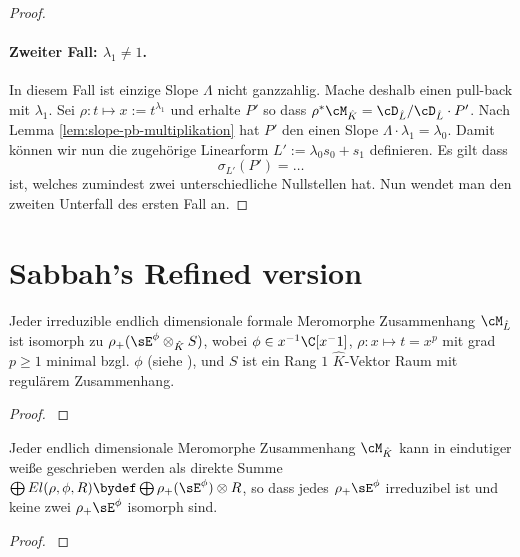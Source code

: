 \begin{proof}
\paragraph{Zweiter Fall: $\lambda_1\neq1$.} In diesem Fall ist einzige Slope
$\Lambda$ nicht ganzzahlig. Mache deshalb einen pull-back mit $\lambda_1$. Sei
$\rho:t\mapsto x:=t^{\lambda_1}$ und erhalte $P'$ so dass $\rho^*\cM_{\hat
K}=\cD_{\hat L}/\cD_{\hat L}\cdot P'$.
Nach Lemma \ref{lem:slope-pb-multiplikation} hat $P'$ den einen Slope
$\Lambda\cdot\lambda_1=\lambda_0$.
Damit können wir nun die zugehörige Linearform $L':=\lambda_0s_0+s_1$
definieren. Es gilt dass
\[
\sigma_{L'}(P')=\dots
\]
ist, welches zumindest zwei unterschiedliche Nullstellen hat. Nun wendet man
den zweiten Unterfall des ersten Fall an.

\end{proof} %

\section{Sabbah's Refined version}
\begin{prop}
\cite[Prop 3.1]{sabbah_Fourier-local}
Jeder irreduzible endlich dimensionale formale Meromorphe Zusammenhang
$\cM_{\hat L}$ ist isomorph zu $\rho_+(\sE^\phi\otimes_{\hat K} S)$, wobei
$\phi\in x^{-1}\C[x^-1]$, $\rho:x\mapsto t=x^p$ mit grad $p\geq1$ minimal bzgl.
$\phi$ (siehe \cite[Rem 2.8]{sabbah_Fourier-local}), und $S$ ist ein Rang $1$
$\hat K$-Vektor Raum mit regulärem Zusammenhang.
\end{prop}
\begin{proof}
\cite[Prop 3.1]{sabbah_Fourier-local}
\end{proof}

\begin{thm}
\cite[Cor 3.3]{sabbah_Fourier-local}
Jeder endlich dimensionale Meromorphe Zusammenhang $\cM_{\hat K}$ kann in
eindutiger weiße geschrieben werden als direkte Summe $\bigoplus
El(\rho,\phi,R)\bydef\bigoplus\rho_+(\sE^\phi)\otimes R$, so dass
jedes $\rho_+\sE^\phi$ irreduzibel ist und keine zwei $\rho_+\sE^\phi$ isomorph
sind.
\end{thm}
\begin{comment}
In welchem Raum ist $\cM$ ?? in $L$ oder in $K$
\end{comment}
\begin{proof}
\cite[Cor 3.3]{sabbah_Fourier-local}
\end{proof}

